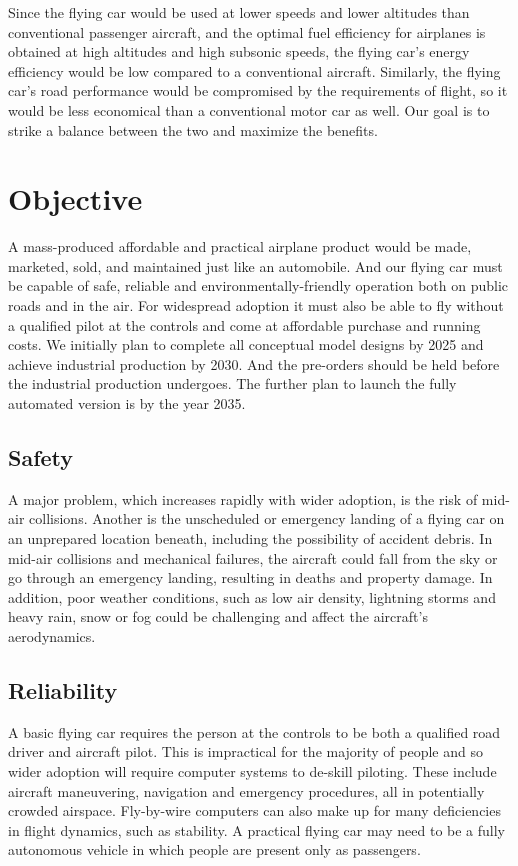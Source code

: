 Since the flying car would be used at lower speeds and lower altitudes than conventional passenger aircraft, and the optimal fuel efficiency for airplanes is obtained at high altitudes and high subsonic speeds, the flying car's energy efficiency would be low compared to a conventional aircraft. Similarly, the flying car's road performance would be compromised by the requirements of flight, so it would be less economical than a conventional motor car as well. Our goal is to strike a balance between the two and maximize the benefits.

\section{Objective}

A mass-produced affordable and practical airplane product would be made, marketed, sold, and maintained just like an automobile. And our flying car must be capable of safe, reliable and environmentally-friendly operation both on public roads and in the air. For widespread adoption it must also be able to fly without a qualified pilot at the controls and come at affordable purchase and running costs. We initially plan to complete all conceptual model designs by 2025 and achieve industrial production by 2030. And the pre-orders should be held before the industrial production undergoes. The further plan to launch the fully automated version is by the year 2035.

\subsection{Safety}

A major problem, which increases rapidly with wider adoption, is the risk of mid-air collisions. Another is the unscheduled or emergency landing of a flying car on an unprepared location beneath, including the possibility of accident debris. In mid-air collisions and mechanical failures, the aircraft could fall from the sky or go through an emergency landing, resulting in deaths and property damage. In addition, poor weather conditions, such as low air density, lightning storms and heavy rain, snow or fog could be challenging and affect the aircraft's aerodynamics.

\subsection{Reliability}

A basic flying car requires the person at the controls to be both a qualified road driver and aircraft pilot. This is impractical for the majority of people and so wider adoption will require computer systems to de-skill piloting. These include aircraft maneuvering, navigation and emergency procedures, all in potentially crowded airspace. Fly-by-wire computers can also make up for many deficiencies in flight dynamics, such as stability. A practical flying car may need to be a fully autonomous vehicle in which people are present only as passengers.

